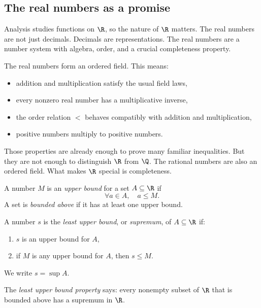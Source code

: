 \subsection{The real numbers as a promise}

Analysis studies functions on $\R$, so the nature of $\R$ matters. The real
numbers are not just decimals. Decimals are representations. The real numbers
are a number system with algebra, order, and a crucial completeness property.

\begin{formalbox}
The real numbers form an ordered field. This means:
\begin{itemize}
\item addition and multiplication satisfy the usual field laws,
\item every nonzero real number has a multiplicative inverse,
\item the order relation $<$ behaves compatibly with addition and multiplication,
\item positive numbers multiply to positive numbers.
\end{itemize}
\end{formalbox}

Those properties are already enough to prove many familiar inequalities. But
they are not enough to distinguish $\R$ from $\Q$. The rational numbers are also
an ordered field. What makes $\R$ special is completeness.

\begin{definition}
A number $M$ is an \emph{upper bound} for a set $A\subseteq\R$ if
\[
\forall a\in A,\quad a\leq M.
\]
A set is \emph{bounded above} if it has at least one upper bound.
\end{definition}

\begin{definition}
A number $s$ is the \emph{least upper bound}, or \emph{supremum}, of
$A\subseteq\R$ if:
\begin{enumerate}
\item $s$ is an upper bound for $A$,
\item if $M$ is any upper bound for $A$, then $s\leq M$.
\end{enumerate}
We write $s=\sup A$.
\end{definition}

\begin{formalbox}
The \emph{least upper bound property} says: every nonempty subset of $\R$ that
is bounded above has a supremum in $\R$.
\end{formalbox}

